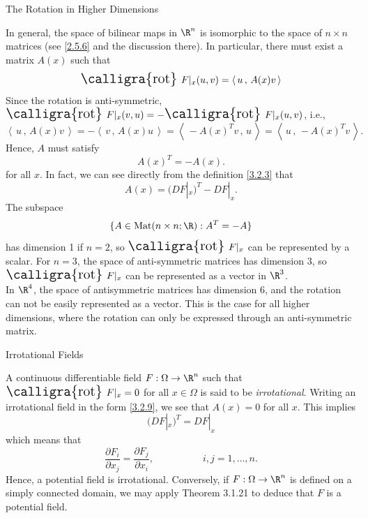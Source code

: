 \documentclass[smaller,hyperref={CJKbookmarks=true}]{beamer}
\newcommand{\scp}[2]{\left\langle\,#1\,,\,#2\,\right\rangle} \newcommand{\scpp}{\langle\,\cdot\,,\,\cdot\,\rangle}
\newcommand{\rot}{\text{\Large{\calligra{rot}}\,}}
\begin{document}
\begin{frame}{The Rotation in Higher Dimensions}
\begin{spacing}{1.05}
In general, the space of bilinear maps in $\R^n$ is isomorphic to the space of $n\times n$ matrices (see \eqref{2.5.6} and the discussion there). In particular, there must exist a matrix $A(x)$ such that
\begin{equation}\label{3.2.9}
  \rot\,F|_x(u,v)=\scp{u}{A(x)v}
\end{equation}
Since the rotation is anti-symmetric, $\rot \,F|_x(v,u)=-\rot\,F|_x(u,v)$, i.e.,
\[\scp{u}{A(x)v}=-\scp{v}{A(x)u}=
\scp{-A(x)^Tv}{u}=\scp{u}{-A(x)^Tv}.\]
Hence, $A$ must satisfy
\[A(x)^T=-A(x).\]
for all $x$. In fact, we can see directly from the definition \eqref{3.2.3} that
\[A(x)=(DF|_x)^T-DF|_x.\]
\newpage
The subspace
\[\{A\in\text{Mat}(n\times n;\R):A^T=-A\}\]
has dimension 1 if $n=2$, so $\rot\,F|_x$ can be represented by a scalar. For $n=3$, the space of anti-symmetric matrices has dimension 3, so $\rot\,F|_x$ can be represented as a vector in $\R^3$.\\[6pt]
In $\R^4$, the space of antisymmetric matrices has dimension 6, and the
rotation can not be easily represented as a vector. This is the case for all
higher dimensions, where the rotation can only be expressed through an
anti-symmetric matrix.
\end{spacing}
\end{frame}
\begin{frame}[c]{Irrotational Fields}
\begin{spacing}{1.1}
A continuous dif{}ferentiable field $F:\Omega\to\R^n$ such that $\rot\,F|_x=0$ for all $x\in\Omega$ is said to be \emph{irrotational}. Writing an irrotational field in the form \eqref{3.2.9}, we see that $A(x)=0$ for all $x$. This implies
\[(DF|_x)^T=DF|_x\]
which means that
\[\frac{\partial F_i}{\partial x_j}
=\frac{\partial F_j}{\partial x_i},
\qquad\qquad\quad i,j=1,\ldots,n.\]
Hence, a potential field is irrotational. Conversely, if $F:\Omega\to\R^n$ is defined on a simply connected domain, we may apply Theorem 3.1.21 to deduce that $F$ is a potential field.
\end{spacing}
\end{frame}
\end{document}
